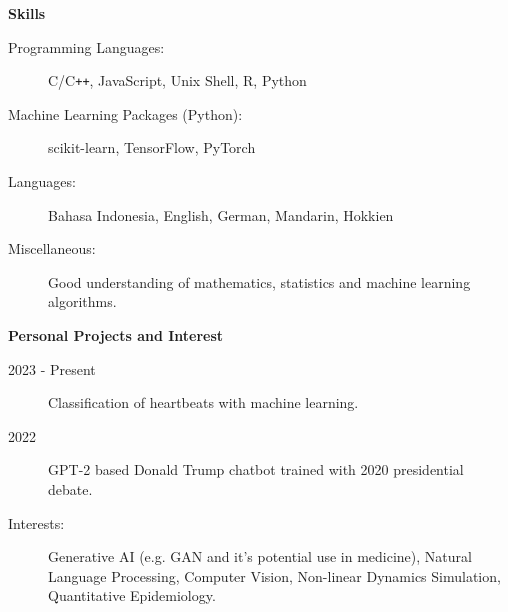\documentclass[a4paper,11pt]{article}
\newcommand{\resheading}[1]{{\large \colorbox{mygrey}{\begin{minipage}{\textwidth}{\textbf{#1 \vphantom{p\^{E}}}}\end{minipage}}}}
\begin{document}
\resheading{Skills}

\begin{description}
\item[Programming Languages:]
C/C{}\verb!++!, JavaScript, Unix Shell, R, Python
\item[Machine Learning Packages (Python):]
scikit-learn, TensorFlow, PyTorch
\item[Languages:]
Bahasa Indonesia, English, German, Mandarin, Hokkien
\item[Miscellaneous:]
Good understanding of mathematics, statistics and machine learning algorithms. 
\end{description}

\resheading{Personal Projects and Interest}

\begin{description}
\item[2023 - Present] Classification of heartbeats with machine learning.
\item[2022] GPT-2 based Donald Trump chatbot trained with 2020 presidential debate.
\item[Interests:] Generative AI (e.g. GAN and it's potential use in medicine), Natural Language Processing, Computer Vision, Non-linear Dynamics Simulation, Quantitative Epidemiology.

\end{description}
\end{document}
